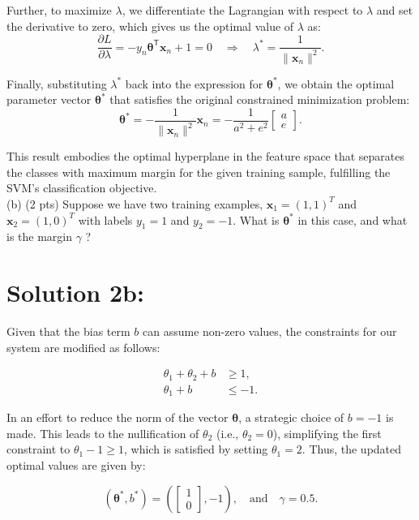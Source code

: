 \documentclass[10pt]{article}
\begin{document}
Further, to maximize $\lambda$, we differentiate the Lagrangian with respect to $\lambda$ and set the derivative to zero, which gives us the optimal value of $\lambda$ as:
\[
\frac{\partial L}{\partial \lambda} = -y_n \boldsymbol{\theta}^\mathsf{T} \mathbf{x}_n + 1 = 0 \quad \Rightarrow \quad \lambda^* = \frac{1}{\lVert \mathbf{x}_n \rVert^2}.
\]

Finally, substituting $\lambda^*$ back into the expression for $\boldsymbol{\theta}^*$, we obtain the optimal parameter vector $\boldsymbol{\theta}^*$ that satisfies the original constrained minimization problem:
\[
\boldsymbol{\theta}^* = -\frac{1}{\lVert \mathbf{x}_n \rVert^2} \mathbf{x}_n = -\frac{1}{a^2 + e^2} \begin{bmatrix} a \\ e \end{bmatrix}.
\]

This result embodies the optimal hyperplane in the feature space that separates the classes with maximum margin for the given training sample, fulfilling the SVM's classification objective. \\


(b) (2 pts) Suppose we have two training examples, $\boldsymbol{x}_{1}=(1,1)^{T}$ and $\boldsymbol{x}_{2}=(1,0)^{T}$ with labels $y_{1}=1$ and $y_{2}=-1$. What is $\boldsymbol{\theta}^{*}$ in this case, and what is the margin $\gamma$ ?

\section*{Solution 2b:}

Given that the bias term $b$ can assume non-zero values, the constraints for our system are modified as follows:

\begin{align*}
\theta_1 + \theta_2 + b &\geq 1, \\
\theta_1 + b &\leq -1.
\end{align*}

In an effort to reduce the norm of the vector $\boldsymbol{\theta}$, a strategic choice of $b = -1$ is made. This leads to the nullification of $\theta_2$ (i.e., $\theta_2 = 0$), simplifying the first constraint to $\theta_1 - 1 \geq 1$, which is satisfied by setting $\theta_1 = 2$. Thus, the updated optimal values are given by:

\begin{equation*}
(\boldsymbol{\theta}^*, b^*) = \left( \begin{bmatrix} 1 \\ 0 \end{bmatrix}, -1 \right), \quad \text{and} \quad \gamma = 0.5.
\end{equation*}
\end{document}
